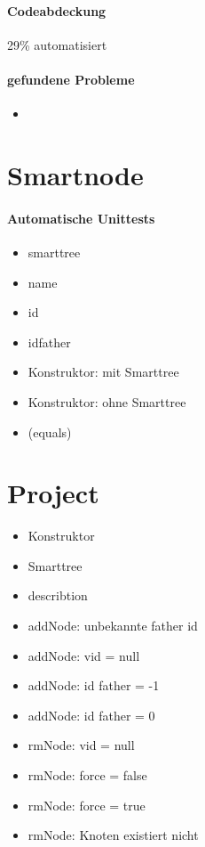 \paragraph*{Codeabdeckung}
29\% automatisiert

\paragraph*{gefundene Probleme}
\begin{itemize}
\item 
\end{itemize}

\section{Smartnode}
\paragraph{Automatische Unittests}
\begin{itemize}
\item smarttree
\item name
\item id
\item idfather
\item Konstruktor: mit Smarttree
\item Konstruktor: ohne Smarttree
\item (equals)
\end{itemize}
\section{Project}
\begin{itemize}
\paragraph{Automatische Unittests}
\item Konstruktor
\item Smarttree
\item describtion
\item addNode: unbekannte father id
\item addNode: vid = null
\item addNode: id father = -1
\item addNode: id father = 0
\item rmNode: vid = null
\item rmNode: force = false
\item rmNode: force = true
\item rmNode: Knoten existiert nicht
\end{itemize}
